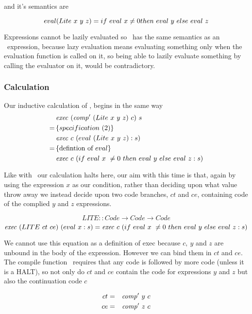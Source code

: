 \documentclass {article}
\begin{document}
and it's semantics are

\begin{equation}
eval(Lite\ x\ y\ z) \\
	= if\ eval\ x \not= 0 then\ eval\ y\ else\ eval\ z 
			\label{evallite}
\end{equation}

Expressions cannot be lazily evaluated
so \lite\ has the same semantics
as an \ite\ expression,
because lazy evaluation means evaluating
something only when the evaluation function
is called on it,
so being able to lazily evaluate something 
by calling the evaluator on it,
would be contradictory.

\subsubsection{Calculation}

Our inductive calculation of \lite,
begins in the same way
\begin{align*}
	&\mathit{exec\ } (\mathit{comp'\ }  (Lite\ x\ y\ z)\ c)\ s \\
	=\, & \{specification\ (2) \} \\
	&\mathit{exec\ } c\ (eval\ (Lite\ x\ y\ z) : s) \\
	=\, & \{\mbox{defintion of}\ eval\} \\
	&\mathit{exec\ } c\ (if\ eval\ x\ \not= 0\ then\ eval\ y\ else\ eval\ z : s)
\end{align*}

Like with \ite\ our calculation halts here,
our aim with this time is that, again by using
the expression $x$ as our condition,
rather than deciding upon what value throw away
we instead decide upon two code branches, $ct$ and $ce$,
containing code of the complied $y$ and $z$ expressions.

	\[ LITE :: Code \rightarrow Code \rightarrow Code \]
	\[ \mathit{exec\ } (LITE\ ct\ ce)\ (eval\ x:s) 
	= \mathit{exec\ } c\ (if\ eval\ x\ \not= 0\ then\ eval\ y\ else\ eval\ z : s) \]

We cannot use this equation as a definition of exec 
because $c,\ y$ and $z$ are unbound in the 
body of the expression\cite[page 10]{bandh}.
However we can bind them in $ct$ and $ce$.
The compile function \comp\ requires that any code is followed by
more code (unless it is a HALT),
so not only do  $ct$ and $ce$ contain the code for expressions
 $y$ and $z$ but also the continuation code $c$

\begin{eqnarray*}
	ct &=& \mathit{comp'\ }  y\ c \\
	ce &=& \mathit{comp'\ }  z\ c
\end{eqnarray*}
\end{document}
